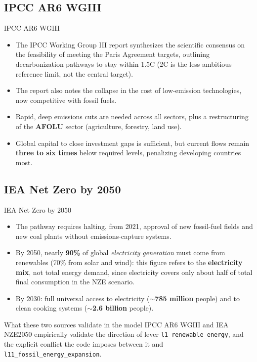 \documentclass[11pt,aspectratio=169]{beamer}
\begin{document}
\subsection{IPCC AR6 WGIII}
\begin{frame}{IPCC AR6 WGIII}
  \begin{itemize}
    \item The IPCC Working Group III report synthesizes the scientific consensus on the feasibility of meeting the Paris Agreement targets, outlining decarbonization pathways to stay \alert{within 1.5\textdegree C} (2\textdegree C is the less ambitious reference limit, not the central target).
    \item The report also notes the collapse in the cost of low-emission technologies, now competitive with fossil fuels.
    \item Rapid, deep emissions cuts are needed across all sectors, plus a restructuring of the \textbf{AFOLU} sector (agriculture, forestry, land use).
    \item Global capital to close investment gaps is sufficient, but current flows remain \textbf{three to six times} below required levels, penalizing developing countries most.
  \end{itemize}
\end{frame}

\subsection{IEA Net Zero by 2050}
\begin{frame}{IEA Net Zero by 2050}
  \footnotesize
  \begin{itemize}
    \item The pathway requires halting, from 2021, approval of \alert{new} fossil-fuel fields and \alert{new} coal plants without emissions-capture systems.
    \item By 2050, nearly \textbf{90\%} of global \emph{electricity generation} must come from renewables (70\% from solar and wind): this figure refers to the \textbf{electricity mix}, not total energy demand, since electricity covers only about half of total final consumption in the NZE scenario.
    \item By 2030: full universal access to electricity (\textbf{$\sim$785 million} people) and to clean cooking systems (\textbf{$\sim$2.6 billion} people).
  \end{itemize}
  \begin{block}{What these two sources validate in the model}
    IPCC AR6 WGIII and IEA NZE2050 empirically validate the direction of lever \texttt{l1\_renewable\_energy}, and the explicit conflict the code imposes between it and \texttt{l11\_fossil\_energy\_expansion}.
  \end{block}
\end{frame}
\end{document}
